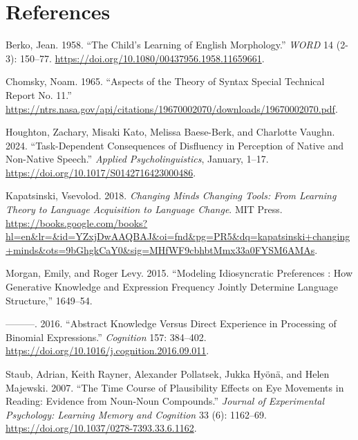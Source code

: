 \documentclass[
  letterpaper,
  DIV=11,
  numbers=noendperiod,
  nottoc]{scrreprt}
\newlength{\cslhangindent}
\newenvironment{CSLReferences}[2] %
 {\begin{list}{}{%
  \setlength{\itemindent}{0pt}
  \setlength{\leftmargin}{0pt}
  \setlength{\parsep}{0pt}
  \ifodd #1
   \setlength{\leftmargin}{\cslhangindent}
   \setlength{\itemindent}{-1\cslhangindent}
  \fi
  \setlength{\itemsep}{#2\baselineskip}}}
 {\end{list}}
\begin{document}

\chapter*{References}\label{references}


\label{refs}
\begin{CSLReferences}{1}{0}
Berko, Jean. 1958. {``The Child's Learning of English Morphology.''}
\emph{{\emph{WORD}}} 14 (2-3): 150--77.
\url{https://doi.org/10.1080/00437956.1958.11659661}.

Chomsky, Noam. 1965. {``Aspects of the Theory of Syntax Special
Technical Report No. 11.''}
\url{https://ntrs.nasa.gov/api/citations/19670002070/downloads/19670002070.pdf}.

Houghton, Zachary, Misaki Kato, Melissa Baese-Berk, and Charlotte
Vaughn. 2024. {``Task-Dependent Consequences of Disfluency in Perception
of Native and Non-Native Speech.''} \emph{Applied Psycholinguistics},
January, 1--17. \url{https://doi.org/10.1017/S0142716423000486}.

Kapatsinski, Vsevolod. 2018. \emph{Changing Minds Changing Tools: From
Learning Theory to Language Acquisition to Language Change}. MIT Press.
\url{https://books.google.com/books?hl=en&lr=&id=YZxjDwAAQBAJ&oi=fnd&pg=PR5&dq=kapatsinski+changing+minds&ots=9bGhgkCaY0&sig=MHfWF9cbhbtMmx33a0FYSM6AMAs}.

Morgan, Emily, and Roger Levy. 2015. {``Modeling Idiosyncratic
Preferences : How Generative Knowledge and Expression Frequency Jointly
Determine Language Structure,''} 1649--54.

---------. 2016. {``Abstract Knowledge Versus Direct Experience in
Processing of Binomial Expressions.''} \emph{Cognition} 157: 384--402.
\url{https://doi.org/10.1016/j.cognition.2016.09.011}.

Staub, Adrian, Keith Rayner, Alexander Pollatsek, Jukka Hyönä, and Helen
Majewski. 2007. {``The Time Course of Plausibility Effects on Eye
Movements in Reading: Evidence from Noun-Noun Compounds.''}
\emph{Journal of Experimental Psychology: Learning Memory and Cognition}
33 (6): 1162--69. \url{https://doi.org/10.1037/0278-7393.33.6.1162}.


\end{CSLReferences}
\end{document}
